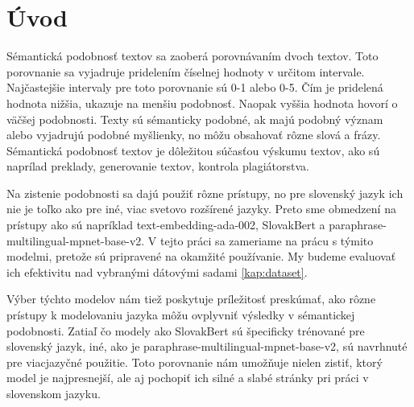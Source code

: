 



\chapter*{Úvod} %

Sémantická podobnosť textov sa zaoberá porovnávaním dvoch textov. Toto porovnanie sa vyjadruje pridelením číselnej hodnoty v určitom intervale. Najčastejšie intervaly pre toto porovnanie sú 0-1 alebo 0-5. Čím je pridelená hodnota nižšia, ukazuje na menšiu podobnosť. Naopak vyššia hodnota hovorí o väčšej podobnosti. Texty sú sémanticky podobné, ak majú podobný význam alebo vyjadrujú podobné myšlienky, no môžu obsahovať rôzne slová a frázy. Sémantická podobnosť textov je dôležitou súčasťou výskumu textov, ako sú naprílad preklady, generovanie textov, kontrola plagiátorstva\cite{semnticka_podobnost_uvod}.

\vspace{1em}

\noindent
Na zistenie podobnosti sa dajú použiť rôzne prístupy, no pre slovenský jazyk ich nie je toľko ako pre iné, viac svetovo rozšírené jazyky. Preto sme obmedzení na prístupy ako sú napríklad text-embedding-ada-002, SlovakBert a paraphrase-multilingual-mpnet-base-v2. V tejto práci sa zameriame na prácu s týmito modelmi, pretože sú pripravené na okamžité používanie. My budeme evaluovať ich efektivitu nad vybranými dátovými sadami \ref{kap:dataset}.
\vspace{1em}

\noindent
Výber týchto modelov nám tiež poskytuje príležitosť preskúmať, ako rôzne prístupy k modelovaniu jazyka môžu ovplyvniť výsledky v sémantickej podobnosti. Zatiaľ čo modely ako SlovakBert sú špecificky trénované pre slovenský jazyk, iné, ako je paraphrase-multilingual-mpnet-base-v2, sú navrhnuté pre viacjazyčné použitie. Toto porovnanie nám umožňuje nielen zistiť, ktorý model je najpresnejší, ale aj pochopiť ich silné a slabé stránky pri práci v slovenskom jazyku.



